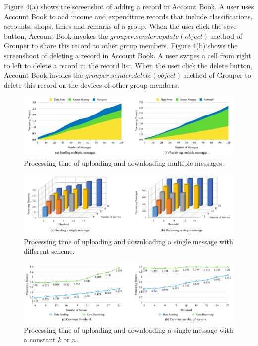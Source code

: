 \documentclass[twocolumn,10pt]{article}
\begin{document}
Figure 4(a) shows the screenshot of adding a record in Account Book. 
A user uses Account Book to add income and expenditure records that include classifications, accounts, shops, times and remarks of a group. 
When the user click the save button, Account Book invokes the $grouper.sender.update(object)$ method of Grouper to share this record to other group members.
Figure 4(b) shows the screenshoot of deleting a record in Account Book. 
A user swipes a cell from right to left to delete a record in the record list. 
When the user click the delete button, Account Book invokes the $grouper.sender.delete(object)$ method of Grouper to delete this record on the devices of other group members.

\begin{figure}[t]
	\centering
	\includegraphics[scale=0.13]{multiple_messages}
	\caption{Processing time of uploading and downloading multiple messages.}
\end{figure}

\begin{figure}[t]
	\centering
	\includegraphics[scale=0.35]{3d}
	\caption{Processing time of uploading and downloading a single message with different scheme.}
\end{figure}

\begin{figure}[t]
	\centering
	\includegraphics[scale=0.13]{constant_k_n}
	\caption{Processing time of uploading and downloading a single message with a constant ${k}$ or ${n}$.}
\end{figure}
\end{document}

